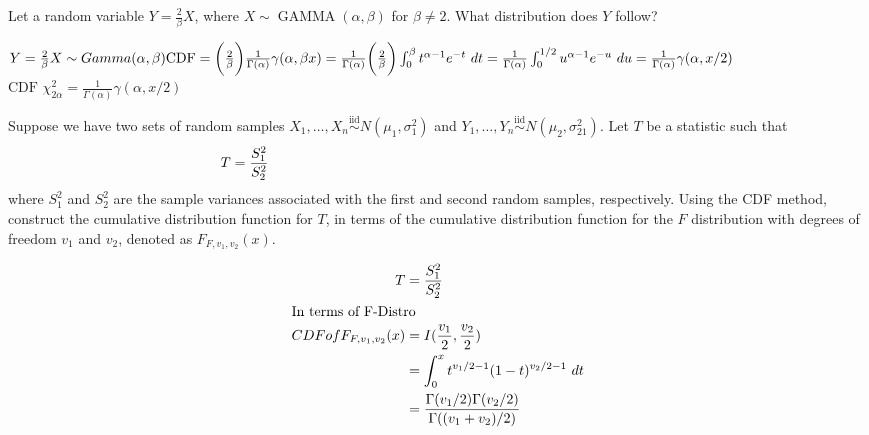 \documentclass[answers]{exam}
\begin{document}
\begin{questions}
\question 
Let a random variable \(Y=\frac{2}{\beta}X\), where 
\(X \sim \operatorname{GAMMA}(\alpha,\beta)\) for \(\beta\neq2\). 
What distribution does \(Y\) follow?
\begin{solution}
	\(Y=\frac{2}{\beta}X \sim Gamma(\alpha,\beta) \\
	\text{CDF}
	=\bigg(\frac{2}{\beta}\bigg)\frac{1}{\Gamma(\alpha)}\gamma(\alpha,\beta x)
	=\frac{1}{\Gamma(\alpha)} \bigg(\frac{2}{\beta}\bigg) \int_{0}^{\beta}t^{\alpha-1}e^{-t} \ dt
	= \frac{1}{\Gamma(\alpha)} \int_{0}^{1/2}u^{\alpha-1}e^{-u} \ du
	=\frac{1}{\Gamma(\alpha)}\gamma(\alpha,x/2)	\)
	\\
	\(\text{CDF } \chi^2_{2\alpha} = 
		\frac{1}{\Gamma(\alpha)}\gamma(\alpha,x/2)\)
	
\end{solution}

\question 
Suppose we have two sets of random samples 
\(X_1,\ldots,X_n \stackrel{\text{iid}}{\sim} N(\mu_1,\sigma_1^2)\) and 
\(Y_1,\ldots,Y_n \stackrel{\text{iid}}{\sim} N(\mu_2,\sigma_21^2)\). 
Let \(T\) be a statistic such that
	\[T = \frac{S_1^2}{S_2^2}  \hspace{0.8\linewidth}\]
where \(S_1^2\) and \(S_2^2\) are the sample variances associated with the first and second random samples, respectively. 
Using the CDF method, construct the cumulative distribution function for \(T\), 
in terms of the cumulative distribution function for the \(F\) distribution 
with degrees of freedom \(v_1\) and \(v_2\), denoted as \(F_{F,v_1,v_2}(x)\).
\begin{solution}
	\begin{align*}
		T &= \frac{S_1^2}{S_2^2} \\
		\intertext{In terms of F-Distro}
		CDF of F_{F,v_1,v_2}(x)
		&= I(\frac{v_1}{2},\frac{v_2}{2}) \\
		&= \int_{0}^{x}t^{v_1/2-1}(1-t)^{v_2/2-1} \ dt \\
		&= \frac{\Gamma(v_1/2)\Gamma(v_2/2)}{\Gamma((v_1+v_2)/2)}
	\end{align*}
\end{solution}


\end{questions}
\end{document}
